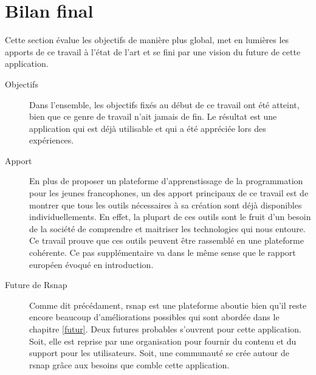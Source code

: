 \section{Bilan final}
Cette section évalue les objectifs de manière plus global, met en lumières les apports de ce travail à l'état de l'art et se fini par une vision du future de cette application.

\begin{description}
  \item[Objectifs] Dans l'ensemble, les objectifs fixés au début de ce travail ont été atteint, bien que ce genre de travail n'ait jamais de fin. Le résultat est une application qui est déjà utilisable et qui a été appréciée lors des expériences.

  \item[Apport] En plus de proposer un plateforme d'apprenstissage de la programmation pour les jeunes francophones, un des apport principaux de ce travail est de montrer que tous les outils nécessaires à sa création sont déjà disponibles individuellements. En effet, la plupart de ces outils sont le fruit d'un besoin de la société de comprendre et maitriser les technologies qui nous entoure. Ce travail prouve que ces outils peuvent être rassemblé en une plateforme cohérente. Ce pas supplémentaire va dans le même sense que le rapport européen \cite{rapport-europeen} évoqué en introduction.

  \item[Future de Rsnap] Comme dit précédament, \gls{rsnap} est une plateforme aboutie bien qu'il reste encore beaucoup d'améliorations possibles qui sont abordée dans le chapitre \ref{futur}. Deux futures probables s'ouvrent pour cette application. Soit, elle est reprise par une organisation pour fournir du contenu et du support pour les utilisateurs. Soit, une communauté se crée autour de \gls{rsnap} grâce aux besoins que comble cette application.

\end{description}